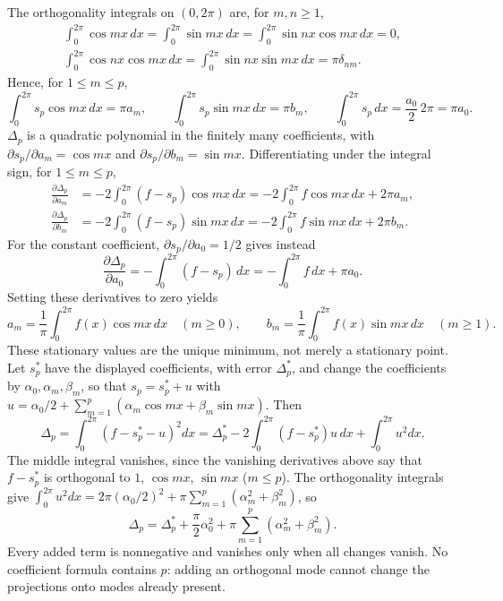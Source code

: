 The orthogonality integrals on $(0,2\pi)$ are, for $m,n\ge1$,
\begin{gather*}
\int_0^{2\pi}\cos mx\,dx=\int_0^{2\pi}\sin mx\,dx
=\int_0^{2\pi}\sin nx\cos mx\,dx=0,\\
\int_0^{2\pi}\cos nx\cos mx\,dx=\int_0^{2\pi}\sin nx\sin mx\,dx
=\pi\delta_{nm}.
\end{gather*}
Hence, for $1\le m\le p$,
\[
\int_0^{2\pi}s_p\cos mx\,dx=\pi a_m,\qquad
\int_0^{2\pi}s_p\sin mx\,dx=\pi b_m,\qquad
\int_0^{2\pi}s_p\,dx=\frac{a_0}2\,2\pi=\pi a_0.
\]
$\Delta_p$ is a quadratic polynomial in the finitely many coefficients,
with $\partial s_p/\partial a_m=\cos mx$ and
$\partial s_p/\partial b_m=\sin mx$. Differentiating under the
integral sign, for $1\le m\le p$,
\begin{align*}
\frac{\partial\Delta_p}{\partial a_m}
 &=-2\int_0^{2\pi}(f-s_p)\cos mx\,dx
 =-2\int_0^{2\pi}f\cos mx\,dx+2\pi a_m,\\
\frac{\partial\Delta_p}{\partial b_m}
 &=-2\int_0^{2\pi}(f-s_p)\sin mx\,dx
 =-2\int_0^{2\pi}f\sin mx\,dx+2\pi b_m.
\end{align*}
For the constant coefficient, $\partial s_p/\partial a_0=1/2$ gives
instead
\[
\frac{\partial\Delta_p}{\partial a_0}
=-\int_0^{2\pi}(f-s_p)\,dx=-\int_0^{2\pi}f\,dx+\pi a_0.
\]
Setting these derivatives to zero yields
\[
\boxed{a_m=\frac1\pi\int_0^{2\pi}f(x)\cos mx\,dx\quad(m\ge0),
\qquad b_m=\frac1\pi\int_0^{2\pi}f(x)\sin mx\,dx\quad(m\ge1).}
\]
These stationary values are the unique minimum, not merely a stationary
point. Let $s_p^*$ have the displayed coefficients, with error
$\Delta_p^*$, and change the coefficients by $\alpha_0,\alpha_m,\beta_m$,
so that $s_p=s_p^*+u$ with
$u=\alpha_0/2+\sum_{m=1}^p(\alpha_m\cos mx+\beta_m\sin mx)$. Then
\[
\Delta_p=\int_0^{2\pi}(f-s_p^*-u)^2dx
=\Delta_p^*-2\int_0^{2\pi}(f-s_p^*)u\,dx+\int_0^{2\pi}u^2dx.
\]
The middle integral vanishes, since the vanishing derivatives above say
that $f-s_p^*$ is orthogonal to $1$, $\cos mx$, $\sin mx$ ($m\le p$).
The orthogonality integrals give
$\int_0^{2\pi}u^2dx=2\pi(\alpha_0/2)^2+\pi\sum_{m=1}^p(\alpha_m^2+\beta_m^2)$,
so
\[
\Delta_p=\Delta_p^*+\frac\pi2\alpha_0^2
+\pi\sum_{m=1}^p(\alpha_m^2+\beta_m^2).
\]
Every added term is nonnegative and vanishes only when all changes vanish.
No coefficient formula contains $p$: adding an orthogonal mode cannot
change the projections onto modes already present.

